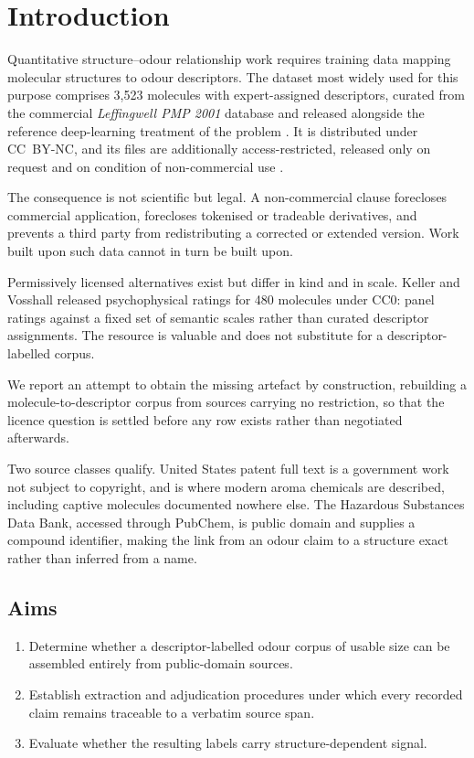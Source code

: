 \documentclass[
  computerscience
]{genesisl1-paper}
\begin{document}
\section{Introduction}

Quantitative structure--odour relationship work requires training data mapping molecular
structures to odour descriptors. The dataset most widely used for this purpose comprises
3{,}523 molecules with expert-assigned descriptors, curated from the commercial
\emph{Leffingwell PMP 2001} database and released alongside the reference deep-learning
treatment of the problem \cite{sanchez2019machine}. It is distributed under CC~BY-NC, and
its files are additionally access-restricted, released only on request and on condition
of non-commercial use \cite{leffingwell2020}.

The consequence is not scientific but legal. A non-commercial clause forecloses
commercial application, forecloses tokenised or tradeable derivatives, and prevents a
third party from redistributing a corrected or extended version. Work built upon such
data cannot in turn be built upon.

Permissively licensed alternatives exist but differ in kind and in scale. Keller and
Vosshall \cite{keller2016} released psychophysical ratings for 480 molecules under CC0:
panel ratings against a fixed set of semantic scales rather than curated descriptor
assignments. The resource is valuable and does not substitute for a descriptor-labelled
corpus.

We report an attempt to obtain the missing artefact by construction, rebuilding a
molecule-to-descriptor corpus from sources carrying no restriction, so that the licence
question is settled before any row exists rather than negotiated afterwards.

Two source classes qualify. United States patent full text is a government work not
subject to copyright, and is where modern aroma chemicals are described, including
captive molecules documented nowhere else. The Hazardous Substances Data Bank, accessed
through PubChem, is public domain and supplies a compound identifier, making the link
from an odour claim to a structure exact rather than inferred from a name.

\subsection{Aims}
\begin{enumerate}
  \item Determine whether a descriptor-labelled odour corpus of usable size can be
        assembled entirely from public-domain sources.
  \item Establish extraction and adjudication procedures under which every recorded
        claim remains traceable to a verbatim source span.
  \item Evaluate whether the resulting labels carry structure-dependent signal.
\end{enumerate}
\end{document}
